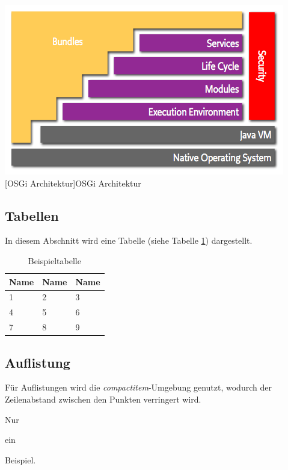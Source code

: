 \documentclass[12pt,a4paper,bibliography=totocnumbered,listof=totoc]{scrartcl}
\begin{document}
\vspace{1em}
\begin{minipage}{\linewidth}
	\centering
	\includegraphics[width=0.7\linewidth]{Bilder/layering-osgi.png}
	[OSGi Architektur]{OSGi Architektur\footnotemark }
	\label{fig:osgi}
\end{minipage}

\subsection{Tabellen}
In diesem Abschnitt wird eine Tabelle (siehe Tabelle \ref{tab:beispiel}) dargestellt.

\vspace{1em}
\begin{table}[!h]
	\centering
	\begin{tabular}{|l|l|l|}
		\hline
		\textbf{Name} & \textbf{Name} & \textbf{Name}\\
		\hline
		1 & 2 & 3\\
		\hline
		4 & 5 & 6\\
		\hline
		7 & 8 & 9\\
		\hline
	\end{tabular}
	\caption{Beispieltabelle}
	\label{tab:beispiel}
\end{table}

\pagebreak
\subsection{Auflistung}
Für Auflistungen wird die \textit{compactitem}-Umgebung genutzt, wodurch der Zeilenabstand zwischen den Punkten verringert wird.

\begin{compactitem}
	\item Nur
	\item ein
	\item Beispiel.
\end{compactitem}
\end{document}
